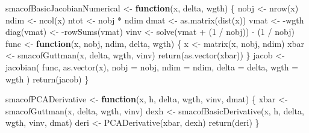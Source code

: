 \documentclass[
  12pt,
  letterpaper,
  DIV=11,
  numbers=noendperiod]{scrartcl}
\newenvironment{Shaded}{\begin{snugshade}}{\end{snugshade}}
\newcommand{\AttributeTok}[1]{\textcolor[rgb]{0.40,0.45,0.13}{#1}}
\newcommand{\ControlFlowTok}[1]{\textcolor[rgb]{0.00,0.23,0.31}{\textbf{#1}}}
\newcommand{\DecValTok}[1]{\textcolor[rgb]{0.68,0.00,0.00}{#1}}
\newcommand{\FunctionTok}[1]{\textcolor[rgb]{0.28,0.35,0.67}{#1}}
\newcommand{\NormalTok}[1]{\textcolor[rgb]{0.00,0.23,0.31}{#1}}
\newcommand{\OtherTok}[1]{\textcolor[rgb]{0.00,0.23,0.31}{#1}}
\newcommand{\SpecialCharTok}[1]{\textcolor[rgb]{0.37,0.37,0.37}{#1}}
\begin{document}
\begin{Shaded}
\begin{Highlighting}[]
\NormalTok{smacofBasicJacobianNumerical }\OtherTok{\textless{}{-}} \ControlFlowTok{function}\NormalTok{(x, delta, wgth) \{}
\NormalTok{  nobj }\OtherTok{\textless{}{-}} \FunctionTok{nrow}\NormalTok{(x)}
\NormalTok{  ndim }\OtherTok{\textless{}{-}} \FunctionTok{ncol}\NormalTok{(x)}
\NormalTok{  ntot }\OtherTok{\textless{}{-}}\NormalTok{ nobj }\SpecialCharTok{*}\NormalTok{ ndim}
\NormalTok{  dmat }\OtherTok{\textless{}{-}} \FunctionTok{as.matrix}\NormalTok{(}\FunctionTok{dist}\NormalTok{(x))}
\NormalTok{  vmat }\OtherTok{\textless{}{-}} \SpecialCharTok{{-}}\NormalTok{wgth}
  \FunctionTok{diag}\NormalTok{(vmat) }\OtherTok{\textless{}{-}} \SpecialCharTok{{-}}\FunctionTok{rowSums}\NormalTok{(vmat)}
\NormalTok{  vinv }\OtherTok{\textless{}{-}} \FunctionTok{solve}\NormalTok{(vmat }\SpecialCharTok{+}\NormalTok{ (}\DecValTok{1} \SpecialCharTok{/}\NormalTok{ nobj)) }\SpecialCharTok{{-}}\NormalTok{ (}\DecValTok{1} \SpecialCharTok{/}\NormalTok{ nobj)}
\NormalTok{  func }\OtherTok{\textless{}{-}} \ControlFlowTok{function}\NormalTok{(x, nobj, ndim, delta, wgth) \{}
\NormalTok{    x }\OtherTok{\textless{}{-}} \FunctionTok{matrix}\NormalTok{(x, nobj, ndim)}
\NormalTok{    xbar }\OtherTok{\textless{}{-}} \FunctionTok{smacofGuttman}\NormalTok{(x, delta, wgth, vinv)}
    \FunctionTok{return}\NormalTok{(}\FunctionTok{as.vector}\NormalTok{(xbar))}
\NormalTok{  \}}
\NormalTok{  jacob }\OtherTok{\textless{}{-}} \FunctionTok{jacobian}\NormalTok{(}
\NormalTok{    func,}
    \FunctionTok{as.vector}\NormalTok{(x),}
    \AttributeTok{nobj =}\NormalTok{ nobj,}
    \AttributeTok{ndim =}\NormalTok{ ndim,}
    \AttributeTok{delta =}\NormalTok{ delta,}
    \AttributeTok{wgth =}\NormalTok{ wgth}
\NormalTok{  )}
  \FunctionTok{return}\NormalTok{(jacob)}
\NormalTok{\}}

\NormalTok{smacofPCADerivative }\OtherTok{\textless{}{-}} \ControlFlowTok{function}\NormalTok{(x, h, delta, wgth, vinv, dmat) \{}
\NormalTok{  xbar }\OtherTok{\textless{}{-}} \FunctionTok{smacofGuttman}\NormalTok{(x, delta, wgth, vinv)}
\NormalTok{  dexh }\OtherTok{\textless{}{-}} \FunctionTok{smacofBasicDerivative}\NormalTok{(x, h, delta, wgth, vinv, dmat)}
\NormalTok{  deri }\OtherTok{\textless{}{-}} \FunctionTok{PCADerivative}\NormalTok{(xbar, dexh)}
  \FunctionTok{return}\NormalTok{(deri)}
\NormalTok{\}}


\end{Highlighting}
\end{Shaded}
\end{document}
